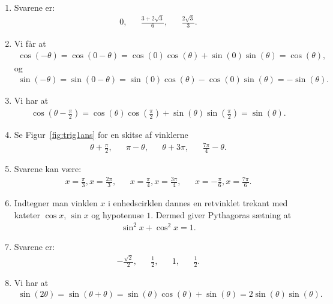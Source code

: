 \begin{enumerate}
	  
\item Svarene er:
\begin{align*}
0,&& \frac{3+2\sqrt{3}}{6},&& \frac{2\sqrt{3}}{3}.
\end{align*}
	
	\item Vi får at
	\begin{align*}
	\cos(-\theta)=\cos(0-\theta)=\cos(0)\cos(\theta)+\sin(0)\sin(\theta)=\cos(\theta),
	\end{align*}
	og 
	\begin{align*}
	\sin(-\theta)=\sin(0-\theta)=\sin(0)\cos(\theta)- \cos(0)\sin(\theta)=-\sin(\theta).
	\end{align*}
	
	\item Vi har at
	\begin{align*}
	\cos(\theta-\frac{\pi}{2})=\cos(\theta)\cos(\frac{\pi}{2})+\sin(\theta)\sin(\frac{\pi}{2})=\sin(\theta).
	\end{align*}
	  
	  	\item \label{it:trig1ans} Se Figur~\ref{fig:trig1ans} for en skitse af vinklerne
	  \begin{align*}
	  \theta+ \frac{\pi}{2},&& \pi-\theta,&& \theta +3\pi,&& \frac{7\pi}{4}-\theta.
	  \end{align*}

	 
	 \item Svarene kan være:
	 \begin{align*}
	 x=\frac{\pi}{3},x=\frac{2\pi}{3},&& x=\frac{\pi}{4},x=\frac{3\pi}{4},&& x=-\frac{\pi}{6},x=\frac{7\pi}{6}.
	 \end{align*}

	\item Indtegner man vinklen $x$ i enhedscirklen dannes en retvinklet trekant med kateter $\cos x$, $\sin x$ og hypotenuse $1$. Dermed giver Pythagoras sætning at
	\begin{align*}
	\sin^2x+\cos^2x=1.
	\end{align*}

	\item Svarene er:
	\begin{align*}
	-\frac{\sqrt{2}}{2},&& \frac{1}{2},&&1,&& \frac{1}{2}.
	\end{align*}
	
	\item\label{it:trig2} Vi har at 
	\begin{align*}
	\sin(2\theta)=\sin(\theta+\theta)=\sin(\theta)\cos(\theta)+\sin(\theta)=2\sin(\theta)\sin(\theta).
	\end{align*}


\end{enumerate}
